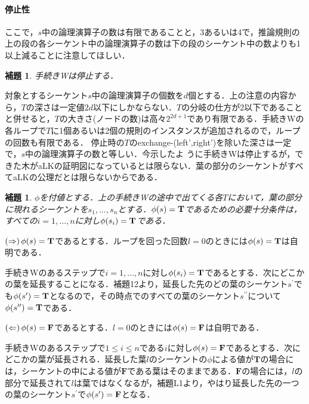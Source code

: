 \documentclass{ltjsarticle}
\makeatletter
\theoremstyle{mystyle1}
\theoremstyle{mystyle3}
\newtheorem{lem}[cor]{補題}
\theoremstyle{mystyle2}
\renewenvironment{proof}[1][\proofname]{\par
  \pushQED{\qed}%
  \normalfont
  \topsep6\p@\@plus6\p@ \trivlist
  \item[\hskip\labelsep{\bfseries\sffamily #1}]\ignorespaces
}{%
  \popQED\endtrivlist\@endpefalse
}
\renewcommand\proofname{証明:}
\newcommand{\bT}{\ensuremath{\mathbf{T}}}
\newcommand{\bF}{\ensuremath{\mathbf{F}}}
\makeatother
\begin{document}
\paragraph{停止性}
ここで，$s$中の論理演算子の数は有限であることと，3あるいは4で，推論規則の上の段の各シーケント中の論理演算子の数は下の段のシーケント中の数よりも1以上減ることに注意してほしい．
\begin{lem}
  手続きWは停止する．
\end{lem}
\begin{proof}
対象とするシーケント$s$中の論理演算子の個数を$d$個とする．上の注意の内容から，$T$の深さは一定値$2d$以下にしかならない．$T$の分岐の仕方が2以下であることと併せると，$T$の大きさ(ノードの数)は高々$2^{2d+1}$であり有限である．手続きWの各ループで$T$に1個あるいは2個の規則のインスタンスが追加されるので，ループの回数も有限である．
\end{proof}
停止時の$T$のexchange-(left',right')を除いた深さは一定で，$s$中の論理演算子の数と等しい．今示したよ うに手続きWは停止するが，できた木がaLKの証明図になっているとは限らない．葉の部分のシーケントがすべてaLKの公理だとは限らないからである．
\begin{lem}
$\phi$を付値とする．上の手続きWの途中で出てくる各$T$において，葉の部分に現れるシーケントを$s_1,\ldots, s_n$とする．$\phi\qty(s)=\bT$であるための必要十分条件は，すべての$i=1,\ldots,n$に対し$\phi\qty(s_i)=\bT$である．
\end{lem}
\begin{proof}
$\qty(\Rightarrow)\,\phi\qty(s)=\bT$であるとする．ループを回った回数$l = 0$のときには$\phi\qty(s) = \bT$は自明である．

手続きWのあるステップで$i = 1,\ldots,n$に対し$\phi\qty(s_i)=\bT$であるとする．次にどこかの葉を延長することになる．補題12より，延長した先のどの葉のシーケント$s^\prime$でも$\phi\qty(s^\prime) = \bT$となるので，その時点でのすべての葉のシーケント$s^{\prime\prime}$について$\phi\qty(s^{\prime\prime}) = \bT$である．

$\qty(\Leftarrow)\, \phi\qty(s) = \bF$であるとする．$l=0$のときには$\phi\qty(s) = \bF$は自明である．

手続きWのあるステップで$1\leq i\leq n$である$i$に対し$\phi\qty(s) = \bF$であるとする．次にどこかの葉が延長される．延長した葉$l$のシーケントの$\phi$による値が\bT の場合には，シーケントの中による値が\bF である葉はそのままである．\bF の場合には，$l$の部分で延長されて$l$は葉ではなくなるが，補題L1より，やはり延長した先の一つの葉のシーケント$s^\prime$で$\phi\qty(s^\prime) = \bF$となる．
\end{proof}
\end{document}
